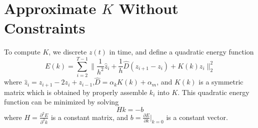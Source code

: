 \documentclass[twocolumn,a4paper]{article}
\begin{document}
\section{Approximate $K$ Without Constraints}
To compute $K$, we discrete $z(t)$ in time, and define a quadratic energy
function
\begin{equation} \label{qua-en}
  E(k) = \sum_{i=2}^{T-1} \|\frac{1}{h^2}\hat{z}_i+\frac{1}{h}\hat{D}(z_{i+1}-z_{i})+ K(k)z_i\|_2^2
\end{equation}
where $\hat{z}_i=z_{i+1}-2z_{i}+z_{i-1}$,$\hat{D}=\alpha_kK(k)+\alpha_m$, and
$K(k)$ is a symmetric matrix which is obtained by properly assemble $k_i$ into
$K$. This quadratic energy function can be minimized by solving
\begin{equation} \label{sol}
  Hk = -b
\end{equation}
where $H = \frac{\partial^2{E}}{\partial^2{k}}$ is a constant matrix, and $b =
\frac{\partial{E}}{\partial{k}}|_{k=0}$ is a constant vector. 
\end{document}
